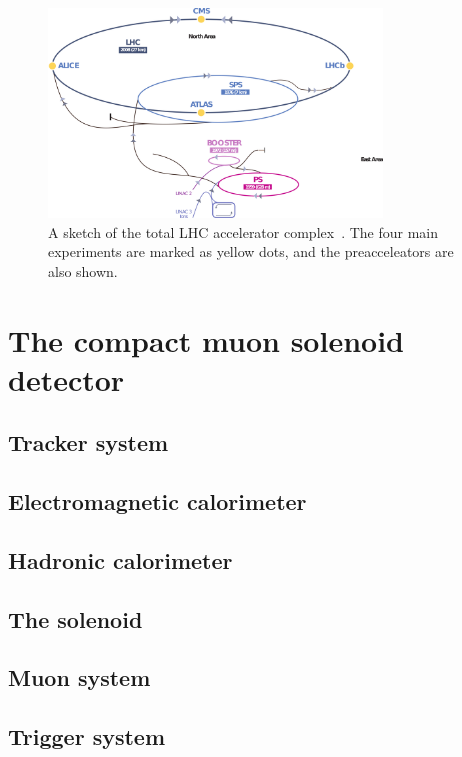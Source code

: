 \begin{figure}[hbtp]
 \centering
 \includegraphics[width=0.79\textwidth]{figures/general/LHC}
 \caption{A sketch of the total LHC accelerator complex~\cite{LHCPicture}. The four main experiments are marked as yellow dots, and the preacceleators are also shown.}
 \label{fig:LHC}
\end{figure}


\section{The compact muon solenoid detector}\label{sec:CMS}




\subsection{Tracker system}
\subsection{Electromagnetic calorimeter}
\subsection{Hadronic calorimeter}
\subsection{The solenoid}
\subsection{Muon system}
\subsection{Trigger system}
